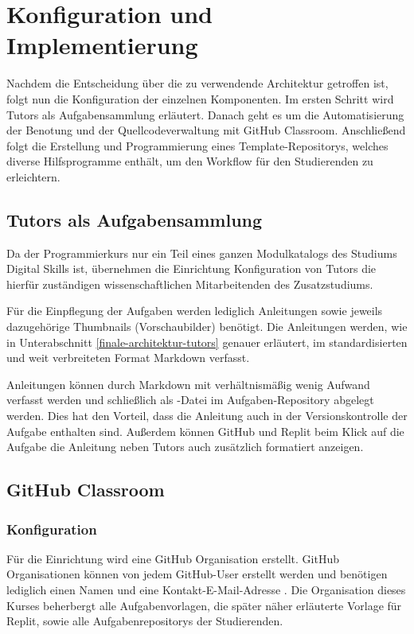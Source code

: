 \section{Konfiguration und Implementierung}\label{konfiguration-u-impl}
Nachdem die Entscheidung über die zu verwendende Architektur getroffen ist,
folgt nun die Konfiguration der einzelnen Komponenten. Im ersten Schritt wird
Tutors als Aufgabensammlung erläutert. Danach geht es um die Automatisierung der
Benotung und der Quellcodeverwaltung mit GitHub Classroom. Anschließend folgt
die Erstellung und Programmierung eines Template-Repositorys, welches diverse
Hilfsprogramme enthält, um den Workflow für den Studierenden zu erleichtern.

\subsection{Tutors als Aufgabensammlung}\label{tutors-als-aufgabensammlung}
Da der Programmierkurs nur ein Teil eines ganzen Modulkatalogs des Studiums
Digital Skills ist, übernehmen die Einrichtung Konfiguration von Tutors die
hierfür zuständigen wissenschaftlichen Mitarbeitenden des Zusatzstudiums.

Für die Einpflegung der Aufgaben werden lediglich Anleitungen sowie
jeweils dazugehörige Thumbnails (Vorschaubilder) benötigt. Die Anleitungen
werden, wie in Unterabschnitt \ref{finale-architektur-tutors} genauer erläutert,
im standardisierten und weit verbreiteten Format Markdown verfasst.

Anleitungen können durch Markdown mit verhältnismäßig wenig Aufwand verfasst
werden und schließlich als -Datei im Aufgaben-Repository
abgelegt werden. Dies hat den Vorteil, dass die Anleitung auch in der
Versionskontrolle der Aufgabe enthalten sind. Außerdem können GitHub und Replit
beim Klick auf die Aufgabe die Anleitung neben Tutors auch zusätzlich
formatiert anzeigen.

\subsection{GitHub Classroom}\label{github-classroom}
\subsubsection{Konfiguration}\label{classroom-konfiguration}
Für die Einrichtung wird eine GitHub Organisation erstellt. GitHub
Organisationen können von jedem GitHub-User erstellt werden und benötigen
lediglich einen Namen und eine Kontakt-E-Mail-Adresse
\parencite{github-organisation-erstellen}. Die Organisation dieses Kurses
beherbergt alle Aufgabenvorlagen, die später näher erläuterte Vorlage für
Replit, sowie alle Aufgabenrepositorys der Studierenden.

